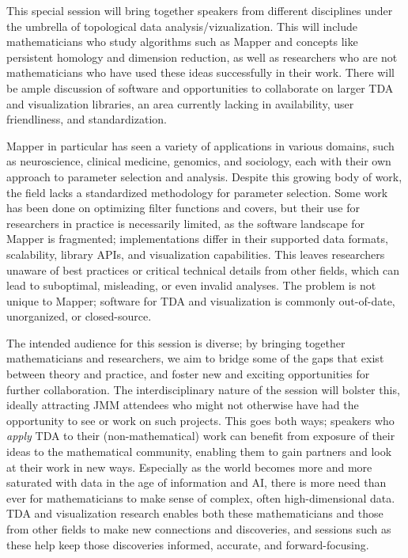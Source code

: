 This special session will bring together speakers from different disciplines under the umbrella of topological data analysis/vizualization. This will include mathematicians who study algorithms such as Mapper and concepts like persistent homology and dimension reduction, as well as researchers who are not mathematicians who have used these ideas successfully in their work. There will be ample discussion of software and opportunities to collaborate on larger TDA and visualization libraries, an area currently lacking in availability, user friendliness, and standardization. 

Mapper in particular has seen a variety of applications in various domains, such as neuroscience, clinical medicine, genomics, and sociology, each with their own approach to parameter selection and analysis. Despite this growing body of work, the field lacks a standardized methodology for parameter selection. Some work has been done on optimizing filter functions and covers, but their use for researchers in practice is necessarily limited, 
as the software landscape for Mapper is fragmented; implementations differ in their supported data formats, scalability, library APIs, and visualization capabilities. This leaves researchers unaware of best practices or critical technical details from other fields, which can lead to suboptimal, misleading, or even invalid analyses. The problem is not unique to Mapper; software for TDA and visualization is commonly out-of-date, unorganized, or closed-source.

The intended audience for this session is diverse; by bringing together mathematicians and researchers, we aim to bridge some of the gaps that exist between theory and practice, and foster new and exciting opportunities for further collaboration. The interdisciplinary nature of the session will bolster this, ideally attracting JMM attendees who might not otherwise have had the opportunity to see or work on such projects. This goes both ways; speakers who \textit{apply} TDA to their (non-mathematical) work can benefit from exposure of their ideas to the mathematical community, enabling them to gain partners and look at their work in new ways. Especially as the world becomes more and more saturated with data in the age of information and AI, there is more need than ever for mathematicians to make sense of complex, often high-dimensional data. TDA and visualization research enables both these mathematicians and those from other fields to make new connections and discoveries, and sessions such as these help keep those discoveries informed, accurate, and forward-focusing.